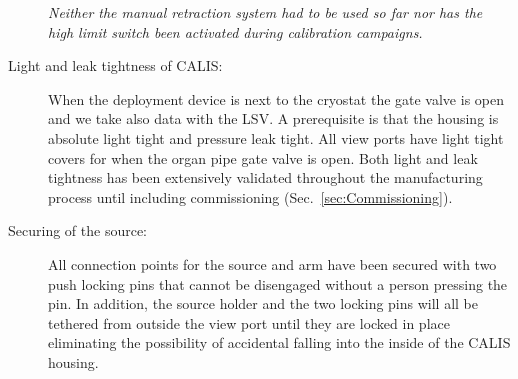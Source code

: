 \begin{description}
\textit{Neither the manual retraction system had to be used so far nor has the high limit switch been activated during calibration campaigns.}
    
\item[Light and leak tightness of CALIS:]
When the deployment device is next to the cryostat the gate valve is open and we take also data with the LSV. A prerequisite is that the housing is absolute light tight and pressure leak tight. All view ports have light tight covers for when the organ pipe gate valve is open. Both light and leak tightness has been extensively validated throughout the manufacturing process until including commissioning (Sec.~\ref{sec:Commissioning}).

\item[Securing of the source:] 
All connection points for the source and arm have been secured with two push locking pins that cannot be disengaged without a person pressing the pin. In addition, the source holder and the two locking pins will all be tethered from outside the view port until they are locked in place eliminating the possibility of accidental falling into the inside of the CALIS housing.

\end{description}
	
